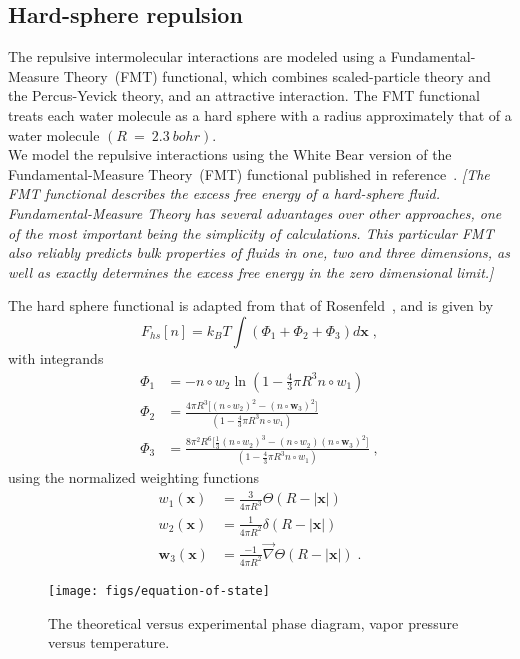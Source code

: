 \documentclass[letterpaper,twocolumn,amsmath,amssymb,prb]{revtex4-1}
\newcommand{\xx}{\textbf{x}}
\newcommand{\needsworklater}[1]{\emph{[#1]}}
\begin{document}
\subsection{Hard-sphere repulsion}
The repulsive intermolecular interactions are modeled using a
Fundamental\nobreakdash-Measure Theory~\cite{rosenfeld1997}(FMT) functional,
which combines scaled-particle theory and the Percus-Yevick theory,
and an attractive interaction.  The FMT functional treats
each water molecule as a hard sphere with a radius approximately that of
a water molecule $(R~=~2.3~bohr)$.\\


We model the repulsive interactions using the White Bear version of
the Fundamental-Measure Theory~(FMT) functional published in
reference~\cite{roth2002whitebear}.  \needsworklater{The FMT
  functional describes the excess free energy of a hard-sphere
  fluid. Fundamental-Measure Theory has several advantages over other
  approaches, one of the most important being the simplicity of
  calculations.  This particular FMT also reliably predicts bulk
  properties of fluids in one, two and three dimensions, as well as
  exactly determines the excess free energy in the zero dimensional
  limit.}

The hard sphere functional is adapted from that of
Rosenfeld~\cite{rosenfeld1997},
and is given by
\begin{equation}
F_{hs}[n] = k_B T \int (\Phi_1 + \Phi_2 + \Phi_3) d\xx \; ,
\end{equation}
with integrands
\begin{align}
\Phi_1 &= -n\circ w_2 \ln\left( 1-\frac{4}{3}\pi R^3 n\circ w_1\right)\\
\Phi_2 &= \frac{4\pi R^3 \lbrack (n\circ w_2)^2 - (n\circ \mathbf{w}_3)^2\rbrack}
          {\left( 1-\frac{4}{3}\pi R^3 n\circ w_1\right)}\\
\Phi_3 &= \frac{8\pi^2 R^6\lbrack \frac{1}{3}(n\circ w_2)^3 - (n\circ
          w_2)(n\circ \mathbf{w}_3)^2\rbrack}
          {\left( 1-\frac{4}{3}\pi R^3 n\circ w_1\right)} \; ,
\end{align}
using the normalized weighting functions 
\begin{align}
w_1(\xx) &= \frac{3}{4\pi R^3}\Theta(R-|\xx|)\\
w_2(\xx) &= \frac{1}{4\pi R^2}\delta(R-|\xx|)\\
\mathbf{w}_3(\xx) &= \frac{-1}{4\pi R^2}\vec{\nabla}\Theta(R-|\xx|) \; .
\end{align}


\begin{figure}
\begin{center}
\texttt{[image: figs/equation-of-state]}
\end{center}
\caption{The theoretical versus experimental phase diagram, vapor
  pressure versus temperature.  }
\label{fig:equation-of-state}
\end{figure}
\end{document}
